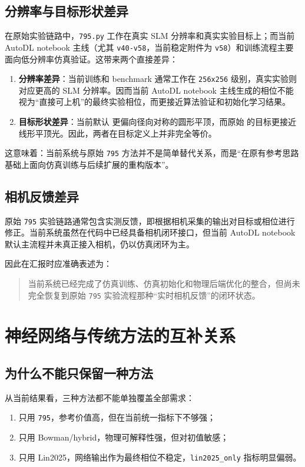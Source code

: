 \documentclass[12pt,a4paper]{ctexart}
\begin{document}
\subsection{分辨率与目标形状差异}
在原始实验链路中，\texttt{795.py} 工作在真实 SLM 分辨率和真实实验目标上；而当前 AutoDL notebook 主线（尤其 \texttt{v40-v58}，当前稳定附件为 \texttt{v58}）和训练流程主要面向低分辨率仿真验证。这带来两个直接差异：
\begin{enumerate}[label=\arabic*.]
    \item \textbf{分辨率差异}：当前训练和 benchmark 通常工作在 \texttt{256x256} 级别，真实实验则对应更高的 SLM 分辨率。因而当前 AutoDL notebook 主线生成的相位不能视为“直接可上机”的最终实验相位，而更接近算法验证和初始化学习结果。
    \item \textbf{目标形状差异}：当前默认  更偏向径向对称的圆形平顶，而原始  的目标更接近线形平顶光。因此，两者在目标定义上并非完全等价。
\end{enumerate}

这意味着：当前系统与原始 \texttt{795} 方法并不是简单替代关系，而是“在原有参考思路基础上面向仿真训练与后续扩展的重构版本”。

\subsection{相机反馈差异}
原始 \texttt{795} 实验链路通常包含实测反馈，即根据相机采集的输出对目标或相位进行修正。当前系统虽然在代码中已经具备相机闭环接口，但当前 AutoDL notebook 默认主流程并未真正接入相机，仍以仿真闭环为主。

因此在汇报时应准确表述为：
\begin{quote}
当前系统已经完成了仿真训练、仿真初始化和物理后端优化的整合，但尚未完全恢复到原始 \texttt{795} 实验流程那种“实时相机反馈”的闭环状态。
\end{quote}

\section{神经网络与传统方法的互补关系}

\subsection{为什么不能只保留一种方法}
从当前结果看，三种方法都不能单独覆盖全部需求：
\begin{enumerate}[label=\arabic*.]
    \item 只用 \texttt{795}，参考价值高，但在当前统一指标下不够强；
    \item 只用 Bowman/hybrid，物理可解释性强，但对初值敏感；
    \item 只用 Lin2025，网络输出作为最终相位不稳定，\texttt{lin2025\_only} 指标明显偏弱。
\end{enumerate}
\end{document}
